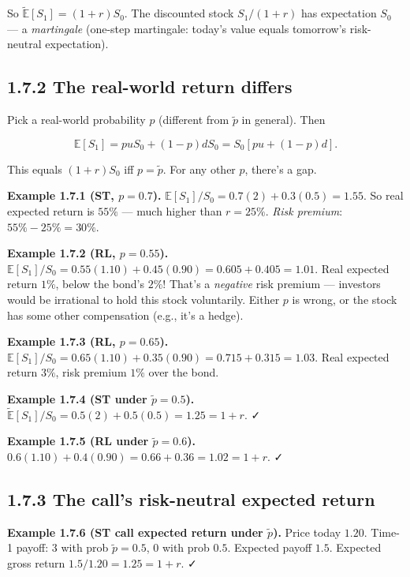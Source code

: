 \documentclass[
  10pt,
  twoside]{book}
\begin{document}
So \(\widetilde{\mathbb E}[S_1] = (1+r)S_0\). The discounted stock
\(S_1/(1+r)\) has expectation \(S_0\) --- a \emph{martingale} (one-step
martingale: today's value equals tomorrow's risk-neutral expectation).

\subsection{1.7.2 The real-world return
differs}\label{the-real-world-return-differs}

Pick a real-world probability \(p\) (different from \(\tilde p\) in
general). Then

\[\mathbb E[S_1] = puS_0 + (1-p)dS_0 = S_0[pu+(1-p)d].\]

This equals \((1+r)S_0\) iff \(p = \tilde p\). For any other \(p\),
there's a gap.

\textbf{Example 1.7.1 (ST, \(p=0.7\)).}
\(\mathbb E[S_1]/S_0 = 0.7(2)+0.3(0.5) = 1.55\). So real expected return
is \(55\%\) --- much higher than \(r=25\%\). \emph{Risk premium}:
\(55\%-25\%=30\%\).

\textbf{Example 1.7.2 (RL, \(p=0.55\)).}
\(\mathbb E[S_1]/S_0 = 0.55(1.10)+0.45(0.90) = 0.605+0.405=1.01\). Real
expected return \(1\%\), below the bond's \(2\%\)! That's a
\emph{negative} risk premium --- investors would be irrational to hold
this stock voluntarily. Either \(p\) is wrong, or the stock has some
other compensation (e.g., it's a hedge).

\textbf{Example 1.7.3 (RL, \(p=0.65\)).}
\(\mathbb E[S_1]/S_0 = 0.65(1.10)+0.35(0.90) = 0.715+0.315=1.03\). Real
expected return \(3\%\), risk premium \(1\%\) over the bond.

\textbf{Example 1.7.4 (ST under \(\tilde p=0.5\)).}
\(\widetilde{\mathbb E}[S_1]/S_0 = 0.5(2)+0.5(0.5)=1.25=1+r\). ✓

\textbf{Example 1.7.5 (RL under \(\tilde p=0.6\)).}
\(0.6(1.10)+0.4(0.90)=0.66+0.36=1.02=1+r\). ✓

\subsection{1.7.3 The call's risk-neutral expected
return}\label{the-calls-risk-neutral-expected-return}

\textbf{Example 1.7.6 (ST call expected return under \(\tilde p\)).}
Price today \(1.20\). Time-1 payoff: \(3\) with prob \(\tilde p=0.5\),
\(0\) with prob \(0.5\). Expected payoff \(1.5\). Expected gross return
\(1.5/1.20 = 1.25 = 1+r\). ✓
\end{document}
